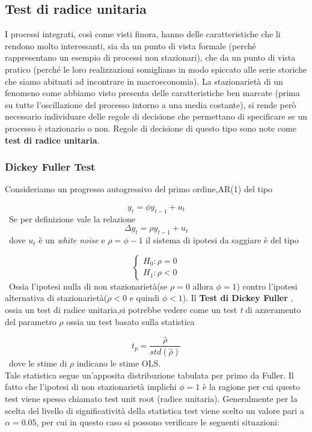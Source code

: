 \documentclass[]{article}
\begin{document}
\subsection{Test di radice unitaria}

I processi integrati, così come visti finora, hanno delle caratteristiche che li
rendono molto interessanti, sia da un punto di vista formale (perché rappresentano un esempio di processi non stazionari), che da un punto di vista
pratico (perché le loro realizzazioni somigliano in modo spiccato alle serie
storiche che siamo abituati ad incontrare in macroeconomia).
La  stazionarietà di un fenomeno come abbiamo visto presenta delle caratteristiche ben marcate (prima su tutte l'oscillazione del processo intorno a una media costante), si rende però necessario individuare delle regole di decisione che permettano di specificare se un processo è stazionario o non. Regole di decisione di questo tipo sono note come \textbf{test di radice unitaria}.
\subsubsection*{Dickey Fuller Test}

Consideriamo un progresso autogressivo del primo ordine,AR(1) del tipo

\begin{equation}
	y_t = \phi y_{t-1} + u_t
\end{equation}
\
Se per definizione vale la relazione
\begin{equation}
	\Delta y_t =\rho y_{t-1} + u_t
\end{equation}
\
dove $u_t$ è un \textit{white noise} e $\rho= \phi - 1$ il sistema di ipotesi da saggiare è del tipo

\begin{equation}
	\begin{cases}
		H_0: \rho = 0 \\
		H_1 : \rho < 0
	\end{cases}
\end{equation}
\
Ossia l'ipotesi nulla di non stazionarietà(se $\rho= 0$ allora $\phi = 1$) contro l'ipotesi alternativa di stazionarietà($\rho < 0 $ e quindi $\phi < 1 $).
Il \textbf{Test di Dickey Fuller} , ossia un test di radice unitaria,si potrebbe vedere come un test \textit{t}  di azzeramento del parametro $\rho$ ossia un test basato sulla statistica 

\begin{equation}
	t_p = \frac{\hat{\rho}}{std(\hat{\rho})}
\end{equation}
\
dove le stime di $\rho$ indicano le stime OLS.
\\
Tale statistica segue un'apposita distribuzione tabulata per primo da Fuller.
Il fatto che l’ipotesi di non stazionarietà implichi $\phi=1$ è la ragione per cui questo test viene spesso chiamato test unit root (radice unitaria).
Generalmente per la scelta del livello di significatività della statistica test viene scelto un valore pari a $\alpha=0.05$, per cui in questo caso si possono verificare le seguenti situazioni:
\end{document}
